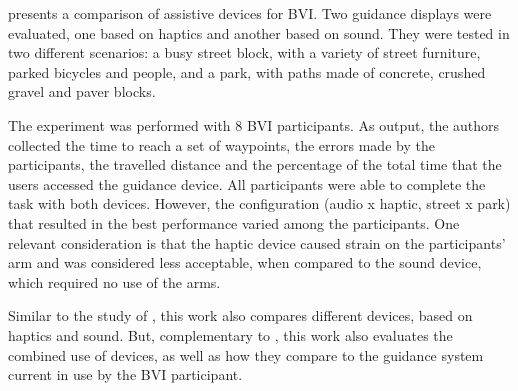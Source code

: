  presents a comparison of assistive devices for BVI. Two guidance displays were evaluated, one based on haptics and another based on sound. They were tested in two different scenarios: a busy street block, with a variety of street furniture, parked bicycles and people, and a park, with paths made of concrete, crushed gravel and paver blocks. 

The experiment was performed with 8 BVI participants. As output, the authors collected the time to reach a set of waypoints, the errors made by the participants, the travelled distance and the percentage of the total time that the users accessed the guidance device. All participants were able to complete the task with both devices. However, the configuration (audio x haptic, street x park) that resulted in the best performance varied among the participants. One relevant consideration is that the haptic device caused strain on the participants’ arm and was considered less acceptable, when compared to the sound device, which required no use of the arms.

Similar to the study of , this work also compares different devices, based on haptics and sound. But, complementary to , this work also evaluates the combined use of devices, as well as how they compare to the guidance system current in use by the BVI participant. 